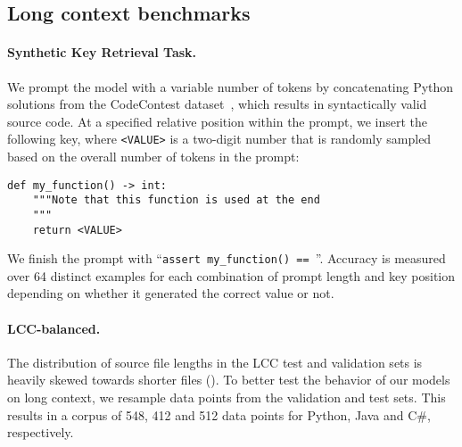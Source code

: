 \documentclass[10pt]{article}
\begin{document}
\subsection{Long context benchmarks}
\label{app:lcft_benchmarks}

\paragraph{Synthetic Key Retrieval Task.}
We prompt the model with a variable number of tokens by concatenating Python solutions from the CodeContest dataset~\citep{li2022alphacode}, which results in syntactically valid source code.
At a specified relative position within the prompt, we insert the following key, where \texttt{<VALUE>} is a two-digit number that is randomly sampled based on the overall number of tokens in the prompt:
\begin{verbatim}
def my_function() -> int:
    """Note that this function is used at the end
    """
    return <VALUE>
\end{verbatim}
We finish the prompt with ``\texttt{assert my\_function() == }''.
Accuracy is measured over 64 distinct examples for each combination of prompt length and key position depending on whether it generated the correct value or not.

\paragraph{LCC-balanced.}
The distribution of source file lengths in the LCC test and validation sets is heavily skewed towards shorter files ().
To better test the behavior of our models on long context, we resample data points from the validation and test sets.
This results in a corpus of 548, 412 and 512 data points for Python, Java and C\#, respectively.
\end{document}
